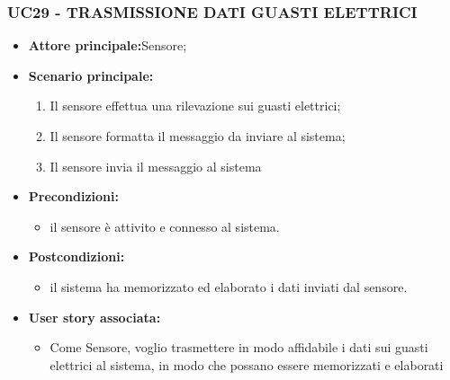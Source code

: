 \subsubsection{UC29 - TRASMISSIONE DATI GUASTI ELETTRICI}
\begin{itemize}
    \item \textbf{Attore principale:}Sensore;
    \item \textbf{Scenario principale:}
          \begin{enumerate}
              \item Il sensore effettua una rilevazione sui guasti elettrici;
              \item Il sensore formatta il messaggio da inviare al sistema;
              \item Il sensore invia il messaggio al sistema
          \end{enumerate}
    \item \textbf{Precondizioni:}
          \begin{itemize}
              \item  il sensore è attivito e connesso al sistema. 
          \end{itemize}
    \item \textbf{Postcondizioni:}
          \begin{itemize}
              \item  il sistema ha memorizzato ed elaborato i dati inviati dal sensore.
          \end{itemize}
    \item \textbf{User story associata:}
          \begin{itemize}
            \item Come Sensore, voglio trasmettere in modo affidabile i dati sui guasti elettrici al sistema, in modo che possano essere memorizzati e elaborati 
          \end{itemize}
\end{itemize}
